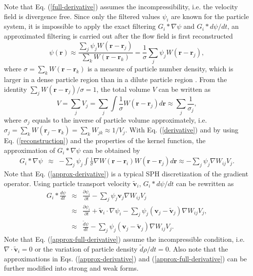 \documentclass[12pt, a4paper,onecolumn]{article}
\begin{document}
%
Note that Eq. (\ref{full-derivative}) assumes the incompressibility, 
i.e. the velocity field is divergence free.
Since only the filtered values $\psi_i$ are known for the particle system, 
it is impossible to apply the exact filtering $G_i * \nabla \psi$ and $G_i * d\psi/d t$,
an approximated filtering is carried out after the flow field is first reconstructed 
%
\begin{equation}
\psi(\mathbf{r})  \approx  \frac{\sum_j\psi_j W(\mathbf{r} - \mathbf{r}_j)}{\sum_k W(\mathbf{r} - \mathbf{r}_k)}
= \frac{1}{\sigma}\sum_j\psi_j W(\mathbf{r} - \mathbf{r}_j),
\label{reconstruction} 
\end{equation}
where 
$\sigma = \sum_k W(\mathbf{r} - \mathbf{r}_k)$ 
is a measure of particle number density,
which is larger in a dense particle region than in a
dilute particle region \cite{KoshizukaNobeOka1998}.
From the identity $\sum_j W(\mathbf{r} - \mathbf{r}_j)/\sigma = 1$,
the total volume $V$ can be written as
%
\begin{equation}\label{volume}
V = \sum_j V_j = \sum_j \int\frac{1}{\sigma}W(\mathbf{r} - \mathbf{r}_j)d\mathbf{r} \approx \sum_j \frac{1}{\sigma_j}, 
\end{equation}
%
where $\sigma_j$ equals to the inverse of particle volume approximately, i.e. $\sigma_j = \sum_k W(\mathbf{r}_j - \mathbf{r}_k) = \sum_k W_{jk} \approx 1/V_j$. 
With Eq. (\ref{derivative}) and by using Eq. (\ref{reconstruction}) and the properties of the kernel function, 
the approximation of $G_i * \nabla \psi$ can be obtained by
%
\begin{eqnarray}
G_i *\nabla \psi  & \approx & - \sum_j \psi_{j}  \int\frac{1}{\sigma}\nabla W(\mathbf{r} - \mathbf{r}_i)W(\mathbf{r} - \mathbf{r}_j)d\mathbf{r} \approx - \sum_j  \psi_{j} \nabla W_{ij} V_j. \label{approx-derivative}
\end{eqnarray}
%
Note that Eq. (\ref{approx-derivative}) is a typical SPH discretization of the gradient operator.
Using particle transport velocity $\widetilde{\mathbf{v}}_{i}$, $G_i * d\psi/d t$ can be rewritten as
%
\begin{eqnarray}
G_i *\frac{d \psi}{dt} & \approx & \frac{\partial \psi_i}{\partial t}  - \sum_j  \psi_{j} \mathbf{v}_{j} \nabla W_{ij} V_j  \nonumber \\
& \approx & \frac{\partial \psi_i}{\partial t} + \widetilde{\mathbf{v}}_{i}\cdot \nabla \psi_i 
- \sum_j  \psi_{j} (\mathbf{v}_{j} - \widetilde{\mathbf{v}}_{j}) \nabla W_{ij} V_j, \nonumber \\
& \approx & \frac{\widetilde{d} \psi}{dt} - \sum_j  \psi_{j} (\mathbf{v}_{j} - \widetilde{\mathbf{v}}_{j}) \nabla W_{ij} V_j.
\label{approx-full-derivative}
\end{eqnarray}
%
Note that Eq. (\ref{approx-full-derivative}) assume the incompressible condition, 
i.e. $\nabla \cdot \widetilde{\mathbf{v}}_{i} = 0$ or the variation of particle density $\widetilde{d} \rho/dt = 0$.
Also note that the approximations in Eqs. (\ref{approx-derivative}) and (\ref{approx-full-derivative}) can be further modified into strong and weak forms.  
%
\end{document}
